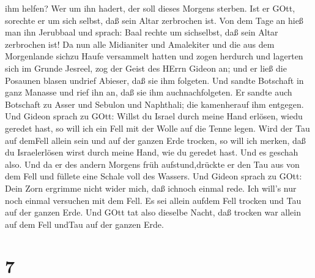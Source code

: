 ihm helfen? Wer um ihn hadert, der soll dieses Morgens sterben. Ist er
GOtt, sorechte er um sich selbst, daß sein Altar zerbrochen ist.
 Von dem Tage an hieß man ihn Jerubbaal und sprach: Baal
rechte um sichselbst, daß sein Altar zerbrochen ist!  Da
nun alle Midianiter und Amalekiter und die aus dem Morgenlande sichzu
Haufe versammelt hatten und zogen herdurch und lagerten sich im Grunde
Jesreel,  zog der Geist des HErrn Gideon an; und er ließ
die Posaunen blasen undrief Abieser, daß sie ihm folgeten. 
Und sandte Botschaft in ganz Manasse und rief ihn an, daß sie ihm
auchnachfolgeten. Er sandte auch Botschaft zu Asser und Sebulon und
Naphthali; die kamenherauf ihm entgegen.  Und Gideon sprach
zu GOtt: Willst du Israel durch meine Hand erlösen, wiedu geredet hast,
 so will ich ein Fell mit der Wolle auf die Tenne legen.
Wird der Tau auf demFell allein sein und auf der ganzen Erde trocken, so
will ich merken, daß du Israelerlösen wirst durch meine Hand, wie du
geredet hast.  Und es geschah also. Und da er des andern
Morgens früh aufstund,drückte er den Tau aus von dem Fell und füllete
eine Schale voll des Wassers.  Und Gideon sprach zu GOtt:
Dein Zorn ergrimme nicht wider mich, daß ichnoch einmal rede. Ich will's
nur noch einmal versuchen mit dem Fell. Es sei allein aufdem Fell
trocken und Tau auf der ganzen Erde.  Und GOtt tat also
dieselbe Nacht, daß trocken war allein auf dem Fell undTau auf der
ganzen Erde.

\hypertarget{section-6}{%
\section{7}\label{section-6}}

